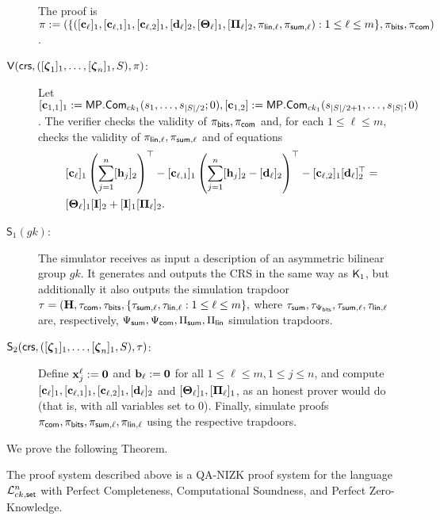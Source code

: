 \begin{description}
The proof is $\pi:=(\{([\mathbf{c}_\ell]_1,[\mathbf{c}_{\ell,1}]_1,[\mathbf{c}_{\ell,2}]_1,[\mathbf{d}_\ell]_2,[\mathbf{{\Theta}}_\ell]_1,[\mathbf{{\Pi}}_\ell]_2,\pi_{\mathsf{lin},\ell},\pi_{\mathsf{sum},\ell}):1\leq\ell\leq m\},\pi_{\mathsf{bits}},\pi_{\mathsf{com}})$.

\item[{$\mathsf{V}(\mathsf{crs},([{\boldsymbol \zeta}_1]_1, \ldots, [{\boldsymbol \zeta}_n]_1,S),\pi)$}:]
Let $[\mathbf{c}_{1,1}]_1:=\mathsf{MP}.\mathsf{Com}_{ck_1}(s_1,\ldots,s_{|S|/2};0),[\mathbf{c}_{1,2}]:=\mathsf{MP}.\mathsf{Com}_{ck_1}(s_{|S|/2+1},\ldots,s_{|S|};0)$. The verifier checks the validity of $\pi_{\mathsf{bits}},\pi_{\mathsf{com}}$ 
and, for each $1\leq \ell\leq m$, checks the validity of $\pi_{\mathsf{lin},\ell},\pi_{\mathsf{sum},\ell}$ and of equations
\begin{align}
&[\mathbf{c}_\ell]_1\left(\sum_{j=1}^n [\mathbf{h}_j]_2\right)^\top-
[\mathbf{c}_{\ell,1}]_1\left(\sum_{j=1}^n[\mathbf{h}_j]_2-[\mathbf{d}_\ell]_2\right)^\top-
[\mathbf{c}_{\ell,2}]_1[\mathbf{d}_\ell]_2^\top = \nonumber\\
&[\mathbf{{\Theta}}_\ell]_1[\mathbf{{I}}]_2+[\mathbf{{I}}]_1[\mathbf{{\Pi}}_\ell]_2.  \label{eq-alog-5}
\end{align}

\item[{$\mathsf{S}_1({gk})$:}] The simulator receives as input a description of an asymmetric bilinear group ${gk}$. It generates and outputs the CRS in the same way as $\mathsf{K}_1$, but additionally it also  outputs the simulation trapdoor 
$\tau=(\mathbf{{H}},\tau_{\mathsf{com}},\tau_{\mathsf{bits}},\{\tau_{\mathsf{sum},\ell},\tau_{\mathsf{lin},\ell}:1\leq\ell\leq m\},$
where $\tau_{\mathsf{sum}},\tau_{\Psi_{\mathsf{bits}}},\tau_{\mathsf{sum},\ell},\tau_{\mathsf{lin,\ell}}$ are, respectively, ${\Psi_{\mathsf{sum}}},{\Psi_{\mathsf{com}}},\Pi_{\mathsf{sum}},\Pi_\mathsf{lin}$ simulation trapdoors.

\item[{$\mathsf{S}_2(\mathsf{crs},([{\boldsymbol \zeta}_1]_1,\ldots,[{\boldsymbol \zeta}_n]_1,S),\tau)$:}] Define $\mathbf{x}^\ell_j:=\mathbf{0}$ and $\mathbf{b}_\ell:=\mathbf{0}$ for all $1\leq\ell\leq m, 1\leq j\leq n$, and compute $[\mathbf{c}_\ell]_1, [\mathbf{c}_{\ell,1}]_1,[\mathbf{c}_{\ell,2}]_1,[\mathbf{d}_\ell]_2$ and $[\mathbf{{\Theta}}_\ell]_1,[\mathbf{{\Pi}}_\ell]_1$, as an honest prover would do (that is, with all variables set to 0).
Finally, simulate proofs $\pi_{\mathsf{com}},\pi_{\mathsf{bits}},\pi_{\mathsf{sum},\ell},\pi_{\mathsf{lin},\ell}$ using the respective trapdoors.
\end{description}

We prove the following Theorem.

\begin{theorem} \label{theo:bits}
The proof system described above is a QA-NIZK proof system for the language $\mathcal{L}_{ck,\mathsf{set}}^n$
 with Perfect Completeness, Computational Soundness, and Perfect Zero-Knowledge.
\end{theorem}	

